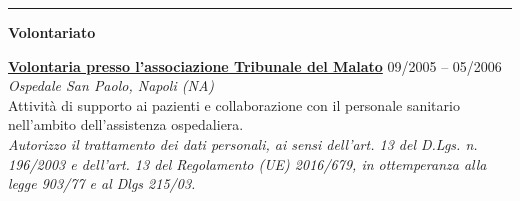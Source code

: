 \documentclass[a4paper]{article}
\newcommand{\block}[1]{\hrule \vspace{0.2cm} \textbf{\Large #1} \vspace{0.2cm}}
\newcommand{\voice}[5]{\href{#4}{\textbf{#1}} \hfill #2 \\ \textit{#3} \\ {\small #5} \vspace{0.2cm} \\}
\begin{document}
    


    \block{Volontariato}

    \voice{Volontaria presso l’associazione Tribunale del Malato}
    {09/2005 -- 05/2006}
    {Ospedale San Paolo, Napoli (NA)}
    {}
    {
    Attività di supporto ai pazienti e collaborazione con il personale sanitario nell’ambito dell’assistenza ospedaliera.
    }

    \vfill
    {\small
        \it
    Autorizzo il trattamento dei dati personali, ai sensi dell’art. 13 del D.Lgs. n. 196/2003 e dell’art. 13 del Regolamento (UE) 2016/679, in ottemperanza alla legge 903/77 e al Dlgs 215/03.
    }
\end{document}
